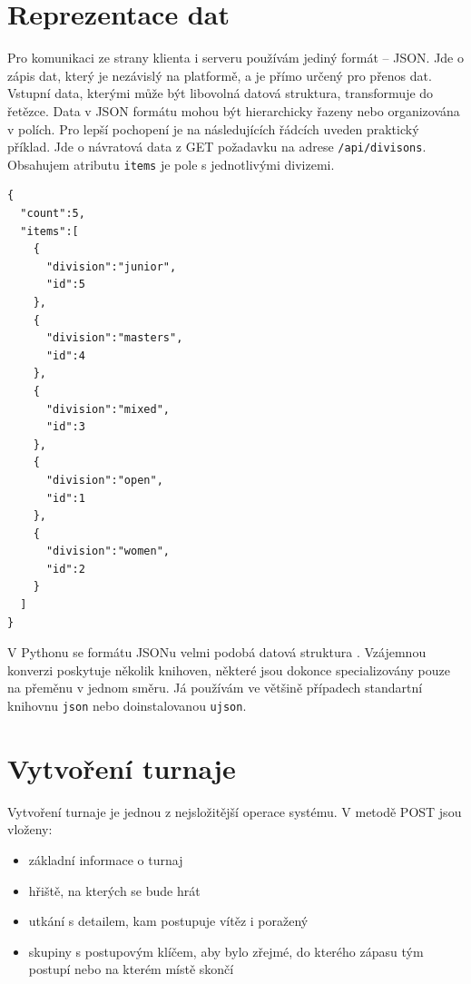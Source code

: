 \section{Reprezentace dat}

Pro komunikaci ze strany klienta i serveru používám jediný formát -- JSON.
Jde o zápis dat, který je nezávislý na platformě, a je přímo určený pro přenos dat.
Vstupní data, kterými může být libovolná datová struktura, transformuje do řetězce.
Data v JSON formátu mohou být hierarchicky řazeny nebo organizována v polích.
Pro lepší pochopení je na následujících řádcích uveden praktický příklad.
Jde o návratová data z GET požadavku na adrese \texttt{/api/divisons}.
Obsahujem atributu \texttt{items} je pole s jednotlivými divizemi.

\begingroup
\fontsize{9.5pt}{11pt}\selectfont
\begin{verbatim}
{
  "count":5,
  "items":[
    {
      "division":"junior",
      "id":5
    },
    {
      "division":"masters",
      "id":4
    },
    {
      "division":"mixed",
      "id":3
    },
    {
      "division":"open",
      "id":1
    },
    {
      "division":"women",
      "id":2
    }
  ]
}
\end{verbatim}
\endgroup

V Pythonu se formátu JSONu velmi podobá datová struktura \cite{python_dict}.
Vzájemnou konverzi poskytuje několik knihoven, některé jsou dokonce specializovány pouze na přeměnu v jednom směru.
Já používám ve většině případech standartní knihovnu \texttt{json}\cite{python_json}
nebo doinstalovanou \texttt{ujson}\cite{python_ujson}.

\section{Vytvoření turnaje}

Vytvoření turnaje je jednou z nejsložitější operace systému. V metodě POST jsou vloženy:

\begin{itemize}
 \item základní informace o turnaj
 \item hřiště, na kterých se bude hrát
 \item utkání s detailem, kam postupuje vítěz i poražený
 \item skupiny s postupovým klíčem, aby bylo zřejmé, do kterého zápasu tým postupí nebo na kterém místě skončí
\end{itemize}

